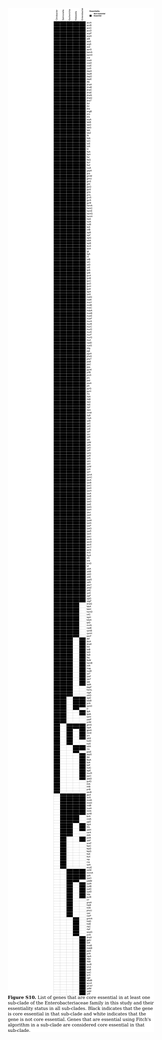 \documentclass{article}
\newcommand{\Newpage}{\end{preview}\begin{preview}}
\begin{document}
\begin{preview}
\includegraphics{suppl10.pdf}
\Newpage

\end{preview}
\end{document}
